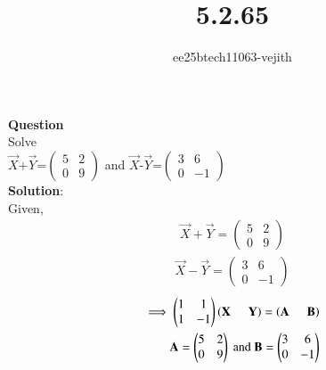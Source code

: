 \documentclass[journal]{IEEEtran}
\begin{document}

\vspace{3cm}

\title{5.2.65}
\author{ee25btech11063-vejith}

\maketitle
{\let\newpage\relax\maketitle}
\renewcommand{\thefigure}{\theenumi}
\renewcommand{\thetable}{\theenumi}
\setlength{\intextsep}{10pt} %
\textbf{Question}\\
Solve\\
$\Vec{X}$+$\Vec{Y}$=$\begin{pmatrix}
    5 & 2\\
    0 & 9
\end{pmatrix}$ and $\Vec{X}$-$\Vec{Y}$=$\begin{pmatrix}
    3 & 6\\
    0 & -1
\end{pmatrix}$\\
\textbf{Solution}:\\
Given,
\begin{align}
    \Vec{X}+\Vec{Y}=\begin{pmatrix}
    5 & 2\\
    0 & 9
    \end{pmatrix}
\end{align}
\begin{align}
    \Vec{X}-\Vec{Y}=\begin{pmatrix}
    3 & 6\\
    0 & -1
\end{pmatrix}
\end{align}
\begin{align}
    \implies \begin{pmatrix}
        1 & 1\\
         1 & -1
    \end{pmatrix} \left(\mathbf{X}\hspace{0.5cm}\mathbf{Y}\right)=\left(\mathbf{A}\hspace{0.5cm}\mathbf{B}\right)\\
     \mathbf{A}= \begin{pmatrix}
    5 & 2\\
    0 & 9
\end{pmatrix} \text{ and } \mathbf{B}=\begin{pmatrix}
    3 & 6\\
    0 & -1
\end{pmatrix}
    \end{align}
\end{document}
